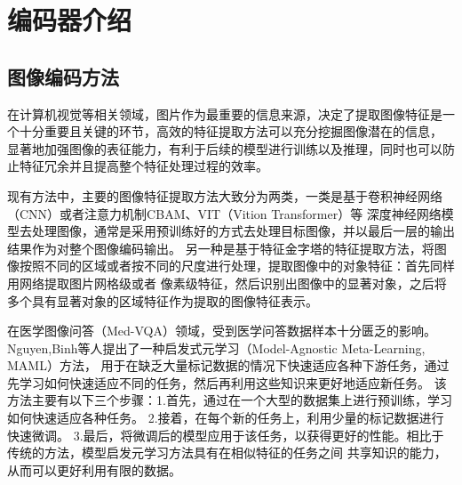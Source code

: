 \section{编码器介绍}
\subsection{图像编码方法}
在计算机视觉等相关领域，图片作为最重要的信息来源，决定了提取图像特征是一个十分重要且关键的环节，高效的特征提取方法可以充分挖掘图像潜在的信息，
显著地加强图像的表征能力，有利于后续的模型进行训练以及推理，同时也可以防止特征冗余并且提高整个特征处理过程的效率。
 
现有方法中，主要的图像特征提取方法大致分为两类，一类是基于卷积神经网络（CNN）或者注意力机制CBAM、VIT（Vition Transformer）等
深度神经网络模型去处理图像，通常是采用预训练好的方式去处理目标图像，并以最后一层的输出结果作为对整个图像编码输出。
另一种是基于特征金字塔的特征提取方法，将图像按照不同的区域或者按不同的尺度进行处理，提取图像中的对象特征：首先同样用网络提取图片网格级或者
像素级特征，然后识别出图像中的显著对象，之后将多个具有显著对象的区域特征作为提取的图像特征表示。

在医学图像问答（Med-VQA）领域，受到医学问答数据样本十分匮乏的影响。Nguyen,Binh等人提出了一种启发式元学习（Model-Agnostic Meta-Learning, MAML）\cite{nguyen2019overcoming}方法，
用于在缺乏大量标记数据的情况下快速适应各种下游任务，通过先学习如何快速适应不同的任务，然后再利用这些知识来更好地适应新任务。
该方法主要有以下三个步骤：1.首先，通过在一个大型的数据集上进行预训练，学习如何快速适应各种任务。
2.接着，在每个新的任务上，利用少量的标记数据进行快速微调。
3.最后，将微调后的模型应用于该任务，以获得更好的性能。相比于传统的方法，模型启发元学习方法具有在相似特征的任务之间
共享知识的能力，从而可以更好利用有限的数据。

